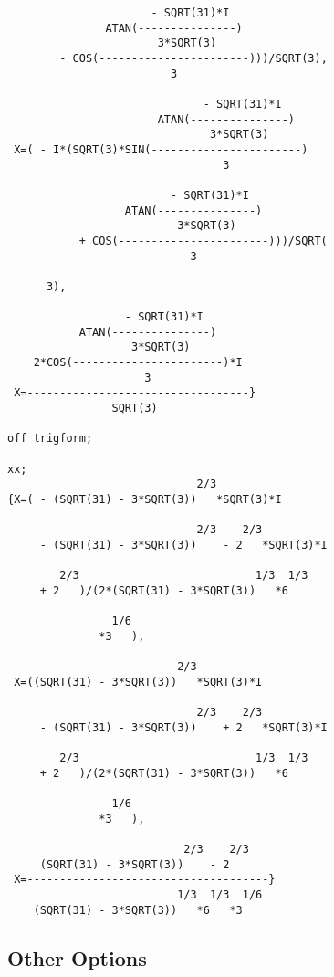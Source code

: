 \documentclass[11pt,letterpaper]{book}
\begin{document}
{\small\begin{verbatim}
                      - SQRT(31)*I
               ATAN(---------------)
                       3*SQRT(3)
        - COS(-----------------------)))/SQRT(3),
                         3

                              - SQRT(31)*I
                       ATAN(---------------)
                               3*SQRT(3)
 X=( - I*(SQRT(3)*SIN(-----------------------)
                                 3

                         - SQRT(31)*I
                  ATAN(---------------)
                          3*SQRT(3)
           + COS(-----------------------)))/SQRT(
                            3

      3),

                  - SQRT(31)*I
           ATAN(---------------)
                   3*SQRT(3)
    2*COS(-----------------------)*I
                     3
 X=----------------------------------}
                SQRT(3)

off trigform;

xx;
                             2/3
{X=( - (SQRT(31) - 3*SQRT(3))   *SQRT(3)*I

                             2/3    2/3
     - (SQRT(31) - 3*SQRT(3))    - 2   *SQRT(3)*I

        2/3                           1/3  1/3
     + 2   )/(2*(SQRT(31) - 3*SQRT(3))   *6

                1/6
              *3   ),

                          2/3
 X=((SQRT(31) - 3*SQRT(3))   *SQRT(3)*I

                             2/3    2/3
     - (SQRT(31) - 3*SQRT(3))    + 2   *SQRT(3)*I

        2/3                           1/3  1/3
     + 2   )/(2*(SQRT(31) - 3*SQRT(3))   *6

                1/6
              *3   ),

                           2/3    2/3
     (SQRT(31) - 3*SQRT(3))    - 2
 X=-------------------------------------}
                          1/3  1/3  1/6
    (SQRT(31) - 3*SQRT(3))   *6   *3
\end{verbatim}}

\subsection{Other Options}
\end{document}
